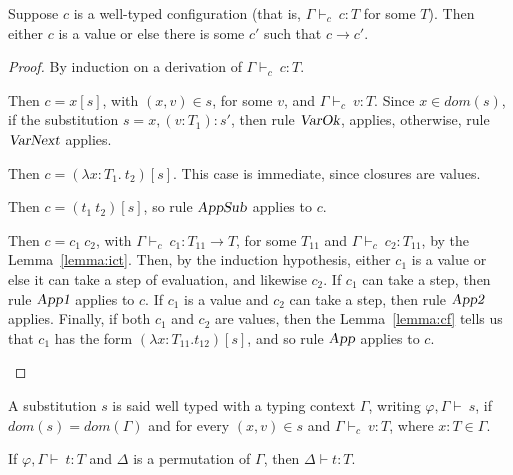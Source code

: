 \documentclass[preprint,authoryear,sort&compress,9pt,nocopyrightspace]{article}
\newcommand{\tto}{\longrightarrow}
\newcommand{\conf}[2][s]{(#2)[#1]}
\newcommand{\Subx}{x,(v:T_1):s'}
\newcommand{\env}{{\emt,\Gamma \vdash \ }}
\newcommand{\tyC}{{\Gamma \vdash_c \ }}
\newcommand{\absD}{\lambda x:T_1. \ t_2}
\newcommand{\emt}{\varphi}
\begin{document}
\begin{theorem}[Progress]
\label{theorem:progress}
\mbox{}
Suppose $c$ is a well-typed configuration (that is, $ \tyC c : T$ for some $T$). Then either $c$ is a value or else there is some $c'$ such that $c \tto c'$.
\end{theorem}

\begin{proof} By induction on a derivation of $\tyC c : T$.
\begin{case}[TCVar]
Then $c = x[s]$, with $(x,v) \in s$, for some $v$,  and $\tyC v:T$. Since $x \in dom(s)$, if the substitution $s = \Subx$, then rule $\textsl {VarOk}$, applies, otherwise, rule $\textsl {VarNext}$ applies.
\end{case}

\begin{case}[TCAbs]
 Then $c = \conf{\absD}$. This case is immediate, since closures are values.
\end{case}

\begin{case}[TCApp] 
 Then $c = \conf{t_1 \ t_2}$, so rule $\textsl {AppSub}$ applies to $c$.
\end{case}

\begin{case}[TCCApp]
 Then $c = c_1 \ c_2$, with $\tyC c_1 : T_{11} \to T$, for some $T_{11}$ and $\tyC c_2 : T_{11}$, by the Lemma~\ref{lemma:ict}. Then, by the induction hypothesis, either $c_1$ is a value or else it can take a step of evaluation, and likewise $c_2$. If $c_1$ can take a step, then rule $\textsl {App1}$ applies to $c$. If $c_1$ is a value and $c_2$ can take a step, then rule $\textsl {App2}$ applies. Finally, if both $c_1$ and $c_2$ are values, then the Lemma~\ref{lemma:cf} tells us that $c_1$ has the form $\conf{\lambda x: T_{11}.t_{12}}$, and so rule $\textsl {App}$ applies to $c$.
\end{case}
\end{proof}

\begin{definition}
\label{definition:wts}
\mbox{}
A substitution $s$ is said well typed with a typing context $\Gamma$, writing $\env s$, if $dom(s) = dom(\Gamma)$ and for every $(x,v) \in s$ and $\tyC v:T$, where $x:T \in \Gamma$.
\end{definition}

\begin{lemma}[Permutation]
\label{lemma:permutation}
\mbox{}
If $\env t : T$ and $\Delta$ is a permutation of $\Gamma$, then $\Delta \vdash t : T$.
\end{lemma}
\end{document}
